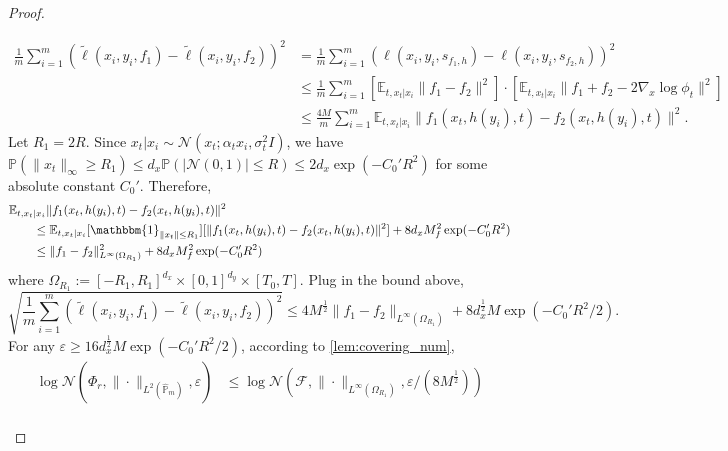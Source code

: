 \documentclass{article}
\numberwithin{equation}{section}
\newcommand{\E}{\mathbb{E}}
\theoremstyle{definition}
\renewcommand{\P}{\mathbb{P}}
\begin{document}
\begin{proof}
\begin{enumerate}[label=\textbf{Step \arabic*.}]
\begin{equation}
                \begin{aligned}
                    \frac{1}{m}\sum_{i=1}^m(\widetilde{\ell}(x_i,y_i,f_1)-\widetilde{\ell}(x_i,y_i,f_2))^2
                    &= \frac{1}{m}\sum_{i=1}^m(\ell(x_i,y_i,s_{f_1,h})-\ell(x_i,y_i,s_{f_2,h}))^2 \\
                    &\leq \frac{1}{m}\sum_{i=1}^m \left[\E_{t,x_t|x_i}\|f_1-f_2\|^2\right]\cdot\left[\E_{t,x_t|x_i}\|f_1+f_2-2\nabla_x\log\phi_t\|^2\right] \\
                    &\leq \frac{4M}{m}\sum_{i=1}^m \E_{t,x_t|x_i}\|f_1(x_t,h(y_i),t)-f_2(x_t,h(y_i),t)\|^2.
                \end{aligned}
            \end{equation}
            Let $R_1=2R$. Since $x_t|x_i\sim\mathcal{N}(x_t;\alpha_tx_i,\sigma_t^2I)$, we have $\P(\|x_t\|_\infty\geq R_1)\leq d_x\P(|\mathcal{N}(0,1)|\leq R)\leq 2d_x\exp(-C_0'R^2)$ for some absolute constant $C_0'$.
            Therefore,
            \begin{equation}
                \begin{aligned}
                    &\E_{t,x_t|x_i}\|f_1(x_t,h(y_i),t)-f_2(x_t,h(y_i),t)\|^2 \\
                    &\qquad \leq \E_{t,x_t|x_i}[\mathbbm{1}_{\|x_t\|\leq R_1}] [\|f_1(x_t,h(y_i),t)-f_2(x_t,h(y_i),t)\|^2] + 8d_xM_f^2\exp(-C_0'R^2) \\
                    &\qquad \leq \|f_1-f_2\|^2_{L^\infty(\Omega_{R_1})} + 8d_xM_f^2\exp(-C_0'R^2)
                \end{aligned}
            \end{equation}
            where $\Omega_{R_1}:=[-R_1,R_1]^{d_x}\times[0,1]^{d_y}\times[T_0,T]$. Plug in the bound above,
            \begin{equation}
                \sqrt{\frac{1}{m}\sum_{i=1}^m(\widetilde{\ell}(x_i,y_i,f_1)-\widetilde{\ell}(x_i,y_i,f_2))^2}
                \leq 4M^{\frac{1}{2}}\|f_1-f_2\|_{L^\infty(\Omega_{R_1})} + 8d_x^{\frac{1}{2}}M\exp(-C_0'R^2/2).
            \end{equation}
            For any $\varepsilon\geq 16d_x^{\frac{1}{2}}M\exp(-C_0'R^2/2)$, according to \ref{lem:covering_num},
            \begin{equation}
                \begin{aligned}
                    \log\mathcal{N}(\Phi_r,\|\cdot\|_{L^2(\widehat{\P}_m)},\varepsilon)
                    &\leq \log\mathcal{N}(\mathcal{F},\|\cdot\|_{L^\infty(\Omega_{R_1})},\varepsilon/(8M^{\frac{1}{2}})) \\

\end{aligned}
\end{equation}
\end{enumerate}
\end{proof}
\end{document}
